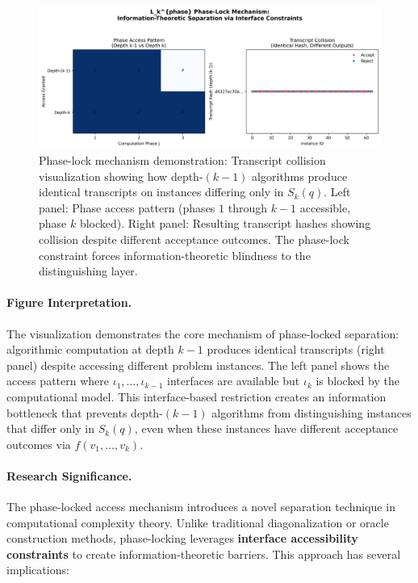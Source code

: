 \begin{figure}[t]
  \centering
  \includegraphics[width=1\linewidth]{fig/lkphase_transcript.png}
  \caption{Phase-lock mechanism demonstration: Transcript collision visualization showing how depth-$(k{-}1)$ algorithms produce identical transcripts on instances differing only in $S_k(q)$. Left panel: Phase access pattern (phases $1$ through $k{-}1$ accessible, phase $k$ blocked). Right panel: Resulting transcript hashes showing collision despite different acceptance outcomes. The phase-lock constraint forces information-theoretic blindness to the distinguishing layer.}
  \label{Lkphase:fig:transcript}
\end{figure}

\paragraph{Figure Interpretation.}
The visualization demonstrates the core mechanism of phase-locked separation: algorithmic computation at depth $k{-}1$ produces identical transcripts (right panel) despite accessing different problem instances. The left panel shows the access pattern where $\iota_1,\ldots,\iota_{k-1}$ interfaces are available but $\iota_k$ is blocked by the computational model. This interface-based restriction creates an information bottleneck that prevents depth-$(k{-}1)$ algorithms from distinguishing instances that differ only in $S_k(q)$, even when these instances have different acceptance outcomes via $f(v_1,\ldots,v_k)$.

\paragraph{Research Significance.}
The phase-locked access mechanism introduces a novel separation technique in computational complexity theory. Unlike traditional diagonalization or oracle construction methods, phase-locking leverages \textbf{interface accessibility constraints} to create information-theoretic barriers. This approach has several implications:

